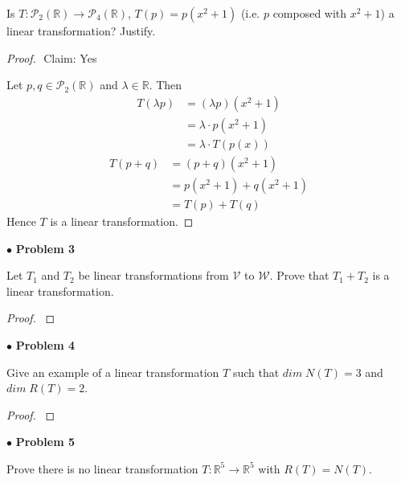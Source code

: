 \documentclass{article}
\begin{document}
\begin{itshape}
Is $T: \mathcal{P}_2(\mathbb{R}) \to \mathcal{P}_4(\mathbb{R})$, $T(p) = p(x^2+1)$ (i.e. $p$ composed with $x^2+1$) a linear transformation? Justify.
\end{itshape}
\medskip

\begin{proof}
$ $\newline
Claim: Yes

Let $p,q \in \mathcal{P}_2(\mathbb{R})$ and $\lambda \in \mathbb{R}$. Then
\begin{align*}
T(\lambda p) &= (\lambda p)(x^2+1) \\
&= \lambda \cdot p(x^2+1) \\
&= \lambda \cdot T(p(x)) 
\end{align*}
\begin{align*}
T(p+q) &= (p+q)(x^2+1) \\
&= p(x^2+1) + q(x^2+1) \\
&= T(p) + T(q)
\end{align*}
Hence $T$ is a linear transformation.
\end{proof}

\newpage
$ \bullet$ \textbf{Problem 3}
\medskip

\begin{itshape}
Let $T_1$ and $T_2$ be linear transformations from $\mathcal{V}$ to $\mathcal{W}$. Prove that $T_1 + T_2$ is a linear transformation.
\end{itshape}
\medskip

\begin{proof}
$ $\newline
\end{proof}

\newpage
$ \bullet$ \textbf{Problem 4}
\medskip

\begin{itshape}
Give an example of a linear transformation $T$ such that $dim \; N(T) = 3$ and  $dim \; R(T) =2$.
\end{itshape}
\medskip

\begin{proof}
$ $\newline
\end{proof}

\newpage
$ \bullet$ \textbf{Problem 5}
\medskip

\begin{itshape}
Prove there is no linear transformation $T: \mathbb{R}^5 \to \mathbb{R}^5$ with $R(T) = N(T)$.
\end{itshape}
\medskip
\end{document}
